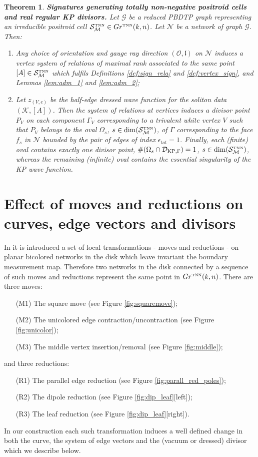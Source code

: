 \documentclass[11pt]{amsart}
\theoremstyle{plain}
\numberwithin{equation}{section}
\newtheorem{theorem}{Theorem}[subsection]
\def \GTNN {{Gr^{\mbox{\tiny TNN}} (k,n)}}
\def \DKP {{\mathcal D}_{\textup{\scriptsize KP},\Gamma}}
\def \S {{\mathcal S}_{\mathcal M}^{\mbox{\tiny TNN}}}
\begin{document}
\begin{theorem}\label{theo:sig_rela}\textbf{Signatures generating totally non-negative positroid cells and real regular KP divisors.}
Let $\mathcal G$ be a reduced PBDTP graph representing an irreducible positroid cell $\S \in \GTNN$. Let $\mathcal N$ be a network of graph $\mathcal G$. Then:
\begin{enumerate}
\item Any choice of orientation and gauge ray direction $(\mathcal O, \mathfrak{l})$ on $\mathcal N$ induces a vertex system of relations of maximal rank associated to the same point $[A]\in\S$ which fulfils Definitions \ref{def:sign_rela} and \ref{def:vertex_sign}, and Lemmas \ref{lem:adm_1} and \ref{lem:adm_2};
\item Let $z_{(V,e)}$ be the half-edge dressed wave function for the soliton data $(\mathcal K, [A])$. Then the system of relations at vertices induces a divisor point $P_V$ on each component $\Gamma_V$ corresponding to a trivalent white vertex $V$ such that $P_V$ belongs to the oval $\Omega_s$, $s\in \dim (\S)$, of $\Gamma$ corresponding to the face $f_s$ in $\mathcal N$ bounded by the pair of edges of index $\epsilon_{tot}=1$. Finally, each (finite) oval contains exactly one divisor point,
$\# (\Omega_s \cap \DKP ) = 1$, $s\in \dim (\S)$, whereas the remaining (infinite) oval contains the essential singularity of the KP wave function. 
\end{enumerate}
\end{theorem}


\section{Effect of moves and reductions on curves, edge vectors and divisors}\label{sec:moves_reduc}

In \cite{Pos} it is introduced a set of local transformations - moves and reductions - on planar bicolored networks in the disk which leave invariant the boundary measurement map. Therefore two networks in the disk connected by a sequence of such moves and reductions represent the same point in $\GTNN$. 
There are three moves: 
\begin{enumerate}
\item[(M1)] The square move (see Figure \ref{fig:squaremove});
\item[(M2)] The unicolored edge contraction/uncontraction (see Figure \ref{fig:unicolor});
\item[(M3)] The middle vertex insertion/removal (see Figure \ref{fig:middle});
\end{enumerate}
and three reductions:
\begin{enumerate}
\item[(R1)] The parallel edge reduction (see Figure \ref{fig:parall_red_poles});
\item[(R2)] The dipole reduction (see Figure \ref{fig:dip_leaf}[left]);
\item[(R3)] The leaf reduction (see Figure \ref{fig:dip_leaf}[right]).
\end{enumerate}
In our construction each such transformation induces a well defined change in both the curve, the system of edge vectors and the (vacuum or dressed) divisor which we describe below.
\end{document}

